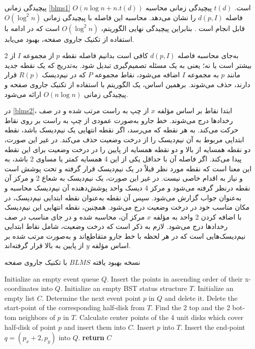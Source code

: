 \documentclass[12pt]{article}
\begin{document}
پیچیدگی زمانی \cref{blms1}
$O(n\log n + n.t(d))$
است. $t(d)$ پیچیدگی زمانی محاسبه فاصله $d(p,I)$ را نشان می‌دهد. محاسبه این فاصله با پیچیدگی زمانی $O(\log^{2}n)$ قابل انجام است \cite{bentley1980decomposable}. بنابراین پیچیدگی نهایی الگوریتم،
$O(\log^{2}n)$
است که در ادامه با استفاده از تکنیک جاروی صفحه، بهبود می‌یابد.

به‌جای محاسبه فاصله $d(p,I)$ کافی است بدانیم فاصله نقطه $p$ از مجموعه $I$ از 2 بیشتر است یا نه؛ یعنی به یک مسئله تصمیم‌گیری تبدیل شود. به‌تدریج که یک نقطه جدید مانند $p$ به مجموعه $I$ اضافه می‌شود، نقاط مجموعه $P$ که در نیم‌دیسک $R(p)$ قرار دارند، حذف می‌شوند. برهمین اساس، یک الگوریتم با استفاده از تکنیک جاروی صفحه و پیچیدگی زمانی $O(n\log n)$ ارائه می‌شود. 

در \cref{blms2}، ابتدا نقاط بر اساس مؤلفه $x$ از چپ به راست مرتب شده و در صف رخدادها درج می‌شوند. خط جارو به‌صورت عمودی از چپ به راست بر روی نقاط حرکت می‌کند. به هر نقطه که می‌رسد، اگر نقطه انتهایی یک نیم‌دیسک باشد، نقطه ابتدایی مربوط به آن نیم‌دیسک را از درخت وضعیت حذف می‌کند. در غیر این صورت، دو نقطه همسایه از بالا و دو نقطه همسایه از پایین را در درخت وضعیت برای این نقطه پیدا می‌کند. اگر فاصله آن با حداقل یکی از این 4 همسایه کمتر یا مساوی 2 باشد، به این معنا است که نقطه مورد نظر قبلاً در یک نیم‌دیسک قرار گرفته و تحت پوشش است و نیاز به اقدام خاصی نیست. در غیر این صورت، یک نیم‌دیسک به شعاع 2 و مرکز آن نقطه درنظر گرفته می‌شود و مرکز 4 دیسک واحد پوشش‌دهنده آن نیم‌دیسک محاسبه و به‌عنوان جواب گزارش می‌شود. سپس آن نقطه به‌عنوان نقطه ابتدایی نیم‌دیسک، در مکان مناسب خود در درخت وضعیت درج می‌شود. همچنین، نقطه انتهایی این نیم‌دیسک با اضافه کردن 2 واحد به مؤلفه $x$ مرکز آن، محاسبه شده و در جای مناسب در صف رخدادها درج می‌شود. لازم به ذکر است که درخت وضعیت، شامل نقاط ابتدایی نیم‌دیسک‌هایی است که در هر لحظه با خط جارو متقاطع‌اند و به‌صورت مرتب شده بر اساس مؤلفه $y$ از پایین به بالا قرار گرفته‌اند.


\begin{algorithm}[H]
\singlespacing
\caption{
نسخه بهبود یافته $BLMS$ با تکنیک جاروی صفحه
}
\label{blms2}
\begin{latin}
\begin{algorithmic}[1]
\STATE Initialize an empty event queue $Q$. Insert the points in ascending order of their x-coordinates into $Q$.
\STATE Initialize an empty BST status structure $T$.
\STATE Initialize an empty list $C$.
    \STATE Determine the next event point $p$ in $Q$ and delete it.
        \STATE Delete the start-point of the corresponding half-disk from $T$.
    \ELSE
        \STATE Find the 2 top and the 2 bottom neighbors of $p$ in $T$.
            \STATE Calculate center points of the 4 unit disks which cover half-disk of point $p$ and insert them into $C$.
            \STATE Insert $p$ into $T$.
            \STATE Insert the end-point $q=(p_x + 2, p_y)$ into $Q$.
        \ENDIF
    \ENDIF
\ENDWHILE
\STATE \textbf{return} $C$
\end{algorithmic}
\end{latin}
\end{algorithm}
\end{document}
